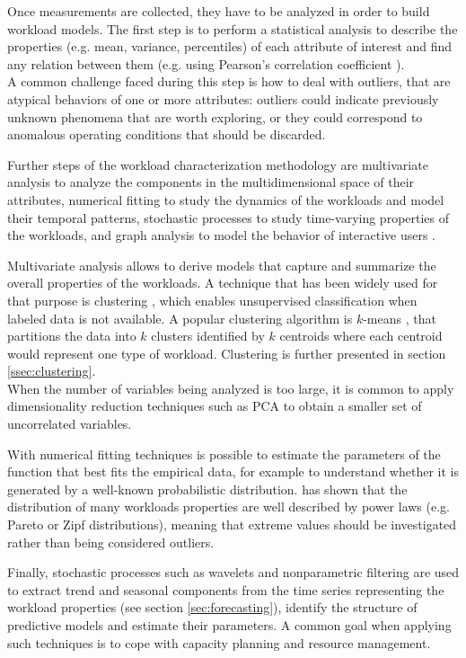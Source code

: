 \documentclass[a4paper]{article} %
\begin{document}
	Once measurements are collected, they have to be analyzed in order to build workload models. The first step is to perform a statistical analysis to describe the properties (e.g. mean, variance, percentiles) of each attribute of interest and find any relation between them (e.g. using Pearson's correlation coefficient \cite{PearsonCoefficient}). \\
	A common challenge faced during this step is how to deal with outliers, that are atypical behaviors of one or more attributes: outliers could indicate previously unknown phenomena that are worth exploring, or they could correspond to anomalous operating conditions that should be discarded.
	
	Further steps of the workload characterization methodology are multivariate analysis to analyze the components in the multidimensional space of their attributes, numerical fitting to study the dynamics of the workloads and model their temporal patterns, stochastic processes to study time-varying properties of the workloads, and graph analysis to model the behavior of interactive users \cite{WorkloadCharacterization}.
	
	Multivariate analysis allows to derive models that capture and summarize the overall properties of the workloads. A technique that has been widely used for that purpose is clustering \cite{ClusteringSurvey}, which enables unsupervised classification when labeled data is not available. A popular clustering algorithm is $k$-means \cite{ClusteringSurvey}, that partitions the data into $k$ clusters identified by $k$ centroids where each centroid would represent one type of workload. Clustering is further presented in section \ref{ssec:clustering}.\\
	When the number of variables being analyzed is too large, it is common to apply dimensionality reduction techniques such as PCA \cite{PCA} to obtain a smaller set of uncorrelated variables.
	
	With numerical fitting techniques is possible to estimate the parameters of the function that best fits the empirical data, for example to understand whether it is generated by a well-known probabilistic distribution. \cite{WorkloadsPowerLaw} has shown that the distribution of many workloads properties are well described by power laws (e.g. Pareto or Zipf distributions), meaning that extreme values should be investigated rather than being considered outliers.
	
	Finally, stochastic processes such as wavelets and nonparametric filtering are used to extract trend and seasonal components from the time series representing the workload properties (see section \ref{sec:forecasting}), identify the structure of predictive models and estimate their parameters. A common goal when applying such techniques is to cope with capacity planning and resource management.
	
\end{document}
